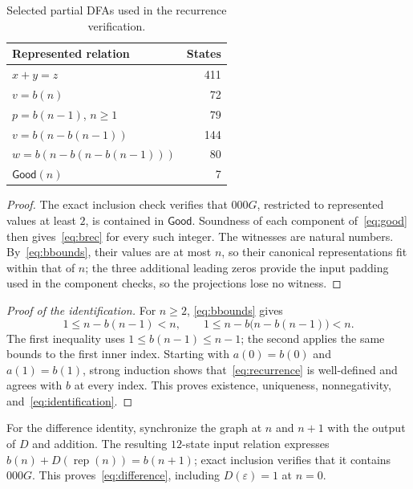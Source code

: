 \documentclass[11pt,a4paper]{article}
\numberwithin{equation}{section}
\newtheorem{proposition}[theorem]{Proposition}
\theoremstyle{remark}
\newcommand{\eps}{\varepsilon}
\newcommand{\rep}{\operatorname{rep}}
\newcommand{\Good}{\mathsf{Good}}
\begin{document}
\begin{table}[tb]
\centering\small
\begin{tabular}{lr}
\toprule
Represented relation & States\\
\midrule
$x+y=z$ & 411\\
$v=b(n)$ & 72\\
$p=b(n-1)$, $n\ge1$ & 79\\
$v=b(n-b(n-1))$ & 144\\
$w=b(n-b(n-b(n-1)))$ & 80\\
$\Good(n)$ & 7\\
\bottomrule
\end{tabular}
\caption{Selected partial DFAs used in the recurrence verification.}
\label{tab:relations}
\end{table}

\begin{proof}
The exact inclusion check verifies that $000G$, restricted to represented
values at least $2$, is contained in $\Good$. Soundness of each component
of~\eqref{eq:good} then gives~\eqref{eq:brec} for every such integer.
The witnesses are natural numbers. By~\eqref{eq:bbounds}, their values
are at most $n$, so their canonical representations fit within that of $n$;
the three additional leading zeros provide the input padding used in the
component checks, so the projections lose no witness.
\end{proof}

\begin{proof}[Proof of the identification]
For $n\ge2$, \eqref{eq:bbounds} gives
\[
 1\le n-b(n-1)<n,\qquad
 1\le n-b\bigl(n-b(n-1)\bigr)<n.
\]
The first inequality uses $1\le b(n-1)\le n-1$; the second applies the
same bounds to the first inner index. Starting with $a(0)=b(0)$ and
$a(1)=b(1)$, strong induction shows that~\eqref{eq:recurrence} is
well-defined and agrees with $b$ at every index. This proves existence,
uniqueness, nonnegativity, and~\eqref{eq:identification}.
\end{proof}

For the difference identity, synchronize the graph at $n$ and $n+1$ with
the output of $D$ and addition. The resulting $12$-state input relation
expresses $b(n)+D(\rep(n))=b(n+1)$; exact inclusion verifies that it contains
$000G$. This proves~\eqref{eq:difference}, including $D(\eps)=1$ at $n=0$.
\end{document}
